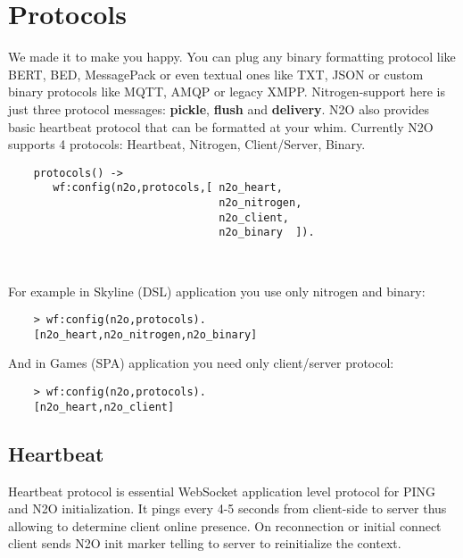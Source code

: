 
\section{Protocols}

We made it to make you happy.
You can plug any binary formatting protocol like BERT, BED, MessagePack
or even textual ones like TXT, JSON or custom binary protocols like MQTT, AMQP or legacy XMPP.
Nitrogen-support here is just three protocol messages: {\bf pickle}, {\bf flush} and {\bf delivery}.
N2O also provides basic heartbeat protocol that can be formatted at your whim.
Currently N2O supports 4 protocols: Heartbeat, Nitrogen, Client/Server, Binary.

\vspace{1\baselineskip}
\begin{lstlisting}
    protocols() ->
       wf:config(n2o,protocols,[ n2o_heart,
                                 n2o_nitrogen,
                                 n2o_client,
                                 n2o_binary  ]).

\end{lstlisting}
\vspace{1\baselineskip}

\

For example in Skyline (DSL) application you use only nitrogen and binary:

\begin{lstlisting}
    > wf:config(n2o,protocols).
    [n2o_heart,n2o_nitrogen,n2o_binary]
\end{lstlisting}

And in Games (SPA) application you need only client/server protocol:

\begin{lstlisting}
    > wf:config(n2o,protocols).
    [n2o_heart,n2o_client]
\end{lstlisting}

\subsection{Heartbeat}

Heartbeat protocol is essential WebSocket application level protocol for
PING and N2O initialization. It pings every 4-5 seconds from client-side to server
thus allowing to determine client online presence. On reconnection or initial connect
client sends N2O init marker telling to server to reinitialize the context.

